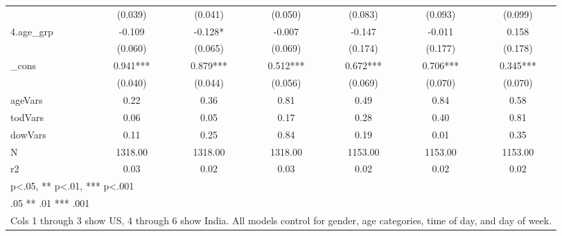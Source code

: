 {\begin{tabular}{l*{6}{c}}
            &     (0.039)   &     (0.041)   &     (0.050)   &     (0.083)   &     (0.093)   &     (0.099)   \\
[1em]
4.age\_grp   &      -0.109   &      -0.128*  &      -0.007   &      -0.147   &      -0.011   &       0.158   \\
            &     (0.060)   &     (0.065)   &     (0.069)   &     (0.174)   &     (0.177)   &     (0.178)   \\
[1em]
\_cons      &       0.941***&       0.879***&       0.512***&       0.672***&       0.706***&       0.345***\\
            &     (0.040)   &     (0.044)   &     (0.056)   &     (0.069)   &     (0.070)   &     (0.070)   \\
\hline
ageVars     &        0.22   &        0.36   &        0.81   &        0.49   &        0.84   &        0.58   \\
todVars     &        0.06   &        0.05   &        0.17   &        0.28   &        0.40   &        0.81   \\
dowVars     &        0.11   &        0.25   &        0.84   &        0.19   &        0.01   &        0.35   \\
N           &     1318.00   &     1318.00   &     1318.00   &     1153.00   &     1153.00   &     1153.00   \\
r2          &        0.03   &        0.02   &        0.03   &        0.02   &        0.02   &        0.02   \\
\hline\hline
\multicolumn{7}{l}{\footnotesize * p<.05, ** p<.01, *** p<.001}\\
\multicolumn{7}{l}{\footnotesize * .05 ** .01 *** .001}\\
\multicolumn{7}{l}{\footnotesize Cols 1 through 3 show US, 4 through 6 show India. All models control for gender, age categories, time of day, and day of week.}\\
\end{tabular}
}
